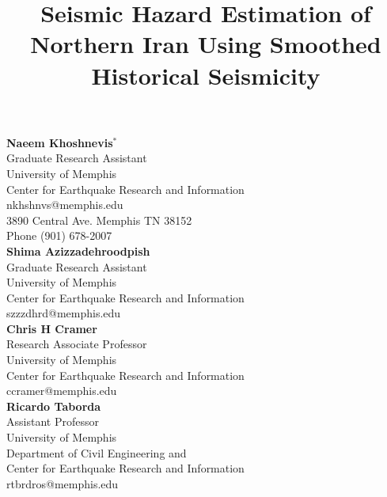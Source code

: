 \documentclass{article}
\title{Seismic Hazard Estimation of Northern Iran Using Smoothed Historical Seismicity}
\begin{document}
\maketitle


\newpage

\begin{center}
\textbf{Naeem Khoshnevis$^*$} \\ Graduate Research Assistant \\  University of Memphis \\ Center for Earthquake Research and Information \\   nkhshnvs@memphis.edu\\   3890 Central Ave. Memphis TN 38152 \\ Phone (901) 678-2007\\
\vspace{10 mm}
 \textbf{Shima Azizzadehroodpish}  \\ Graduate Research Assistant \\ University of Memphis \\ Center for Earthquake Research and Information \\ szzzdhrd@memphis.edu\\  
\vspace{10 mm}
\textbf{Chris H Cramer}   \\ Research  Associate  Professor \\  University of Memphis \\ Center for Earthquake Research and Information \\ ccramer@memphis.edu \\
\vspace{10 mm}
\textbf{Ricardo Taborda}   \\  Assistant  Professor \\  University of Memphis \\ Department of Civil Engineering and \\ Center for Earthquake Research and Information \\ rtbrdros@memphis.edu\\

\end{center}




\newpage
\end{document}
